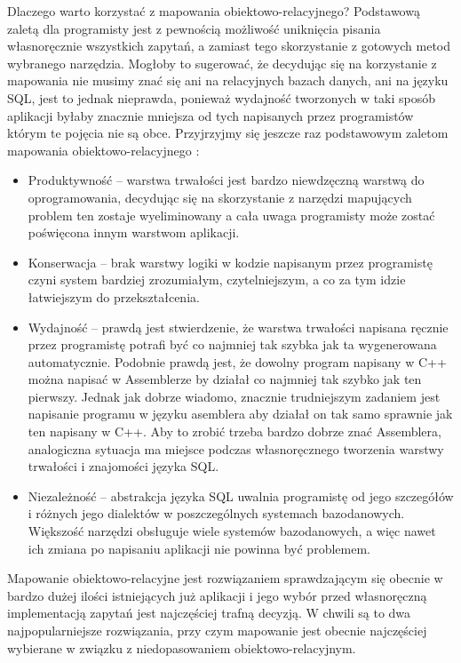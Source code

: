 \documentclass[12pt]{report}
\begin{document}
Dlaczego warto korzystać z mapowania obiektowo-relacyjnego? Podstawową zaletą dla programisty jest z pewnością możliwość uniknięcia pisania własnoręcznie wszystkich
zapytań, a zamiast tego skorzystanie z gotowych metod wybranego narzędzia. Mogłoby to sugerować, że decydując się na korzystanie z mapowania nie musimy znać się
ani na relacyjnych bazach danych, ani na języku SQL, jest to jednak nieprawda, ponieważ wydajność tworzonych w taki sposób aplikacji byłaby znacznie mniejsza od tych
napisanych przez programistów którym te pojęcia nie są obce. Przyjrzyjmy się jeszcze raz podstawowym zaletom mapowania obiektowo-relacyjnego \cite{hibernate}:

\begin{itemize}
\item Produktywność -- warstwa trwałości jest bardzo niewdzęczną warstwą do oprogramowania, decydując się na skorzystanie z narzędzi mapujących problem ten zostaje
wyeliminowany a cała uwaga programisty może zostać poświę\-cona innym warstwom aplikacji.
\item Konserwacja -- brak warstwy logiki w kodzie napisanym przez programistę czyni system bardziej zrozumiałym, czytelniejszym, a co za tym idzie łatwie\-jszym do 
przekształcenia.
\item Wydajność -- prawdą jest stwierdzenie, że warstwa trwałości napisana ręcznie przez programistę potrafi być co najmniej tak szybka jak ta wygenerowana automatycznie.
Podobnie prawdą jest, że dowolny program napisany w C++ można napisać w Assemblerze by działał co najmniej tak szybko jak ten pierwszy. Jednak jak dobrze wiadomo,
znacznie trudniejszym zadaniem jest napisanie programu w języku asemblera aby działał on tak samo sprawnie jak ten napisany w C++. Aby to zrobić trzeba bardzo dobrze
znać Assemblera, analogiczna sytuacja ma miejsce podczas własnoręcznego tworzenia warstwy trwałości i znajomości języka SQL.
\item Niezależność -- abstrakcja języka SQL uwalnia programistę od jego szczegółów i różnych jego dialektów w poszczególnych systemach bazodanowych. Większość narzędzi
obsługuje wiele systemów bazodanowych, a więc nawet ich zmiana po napisaniu aplikacji nie powinna być problemem.
\end{itemize}

Mapowanie obiektowo-relacyjne jest rozwiązaniem sprawdzającym się obecnie w bardzo dużej ilości istniejących już aplikacji i jego wybór przed własnoręczną implementacją 
zapytań jest najczęściej trafną decyzją. W chwili są to dwa najpopularniejsze rozwiązania, przy czym mapowanie jest obecnie najczęściej wybierane w związku z
niedopasowaniem obiektowo-relacyjnym.
\end{document}
